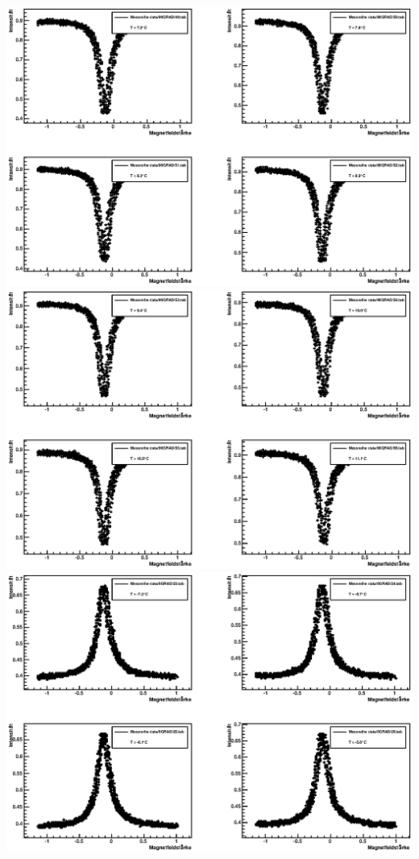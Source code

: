 \documentclass[12pt]{article}
\begin{document}
\includegraphics[width=1\linewidth]{pictures/9.eps} \\
\includegraphics[width=1\linewidth]{pictures/10.eps} \\
\includegraphics[width=1\linewidth]{pictures/11.eps} \\
\end{document}
